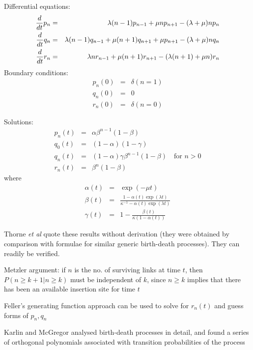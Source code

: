 \documentclass{beamer}
\begin{document}
\begin{frame}{}
Differential equations:
\begin{eqnarray*}
\frac{d}{d {t}} p_n & = & \lambda (n-1) p_{n-1} + \mu n p_{n+1} - (\lambda + \mu) n p_n \\
\frac{d}{d {t}} q_n & = & \lambda (n-1) q_{n-1} + \mu (n+1) q_{n+1} + \mu p_{n+1} - (\lambda + \mu) n q_n \\
\frac{d}{d {t}} r_n & = & \lambda n r_{n-1} + \mu (n+1) r_{n+1} - (\lambda (n+1) + \mu n) r_n
\end{eqnarray*}
Boundary conditions:
\begin{eqnarray*}
p_n(0) & = & \delta (n = 1) \\
q_n(0) & = & 0 \\
r_n(0) & = & \delta (n = 0)
\end{eqnarray*}
\end{frame}

\begin{frame}{}
Solutions:
\begin{eqnarray*}
p_n(t) & = & \alpha \beta^{n-1} (1-\beta) \\
q_0(t) & = & (1-\alpha) (1-\gamma) \\
q_n(t) & = & (1-\alpha) \gamma \beta^{n-1} (1-\beta) \quad \mbox{for $n>0$} \\
r_n(t) & = & \beta^n (1-\beta)
\end{eqnarray*}
where
\begin{eqnarray*}
\alpha(t) & = & \exp (-\mu t) \\
\beta(t) & = & \frac{1 - \alpha(t) \exp(\lambda t)}{\kappa^{-1} - \alpha(t) \exp(\lambda t)} \\
\gamma(t) & = & 1 - \frac{\beta(t)}{\kappa(1-\alpha(t))}
\end{eqnarray*}
\end{frame}

\begin{frame}{}
\itemb
 \item Thorne {\em et al} quote these results without derivation (they were obtained by comparison with formulae for similar generic birth-death processes).
They can readily be verified.
 \item Metzler argument: if $n$ is the no. of surviving links at time $t$, then $P(n \geq k+1|n \geq k)$ must be independent of $k$,
since $n \geq k$ implies that there has been an available insertion site for time $t$
 \item Feller's generating function approach can be used to solve for $r_n(t)$ and guess forms of $p_n,q_n$
 \item Karlin and McGregor analysed birth-death processes in detail,
and found a series of orthogonal polynomials associated with transition probabilities of the process
\iteme
\end{frame}
\end{document}
